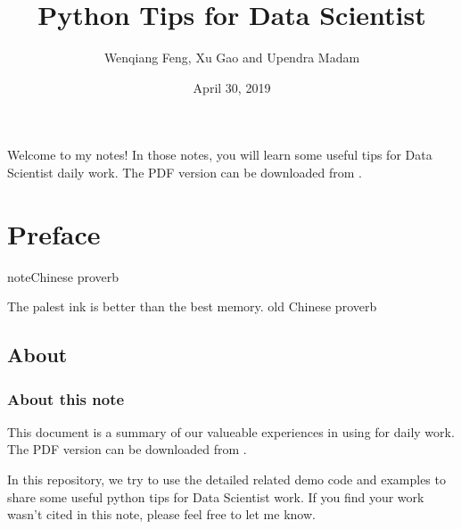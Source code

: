 \documentclass[letterpaper,12pt,english]{sphinxmanual}
\title{Python Tips for Data Scientist}
\date{April 30, 2019}
\author{Wenqiang Feng, Xu Gao and Upendra Madam}
\begin{document}
\pagestyle{empty}
\sphinxmaketitle
\pagestyle{plain}
\sphinxtableofcontents
\pagestyle{normal}
\label{\detokenize{index::doc}}\begin{quote}

\begin{figure}[htbp]
\centering

\noindent{}
\end{figure}
\end{quote}

Welcome to my  notes! In those notes, you will learn some useful tips for Data Scientist daily work. The PDF version can be downloaded from .




\chapter{Preface}
\label{\detokenize{preface:preface}}\label{\detokenize{preface:id1}}\label{\detokenize{preface::doc}}
\begin{sphinxadmonition}{note}{Chinese proverb}

The palest ink is better than the best memory. \textendash{} old Chinese proverb
\end{sphinxadmonition}


\section{About}
\label{\detokenize{preface:about}}

\subsection{About this note}
\label{\detokenize{preface:about-this-note}}
This document is a summary of our valueable experiences in using 
for  daily work. The PDF version can be downloaded from .


In this repository, we try to use the detailed  related demo code and
examples to share some useful python tips for Data Scientist work. If you
find your work wasn’t cited in this note, please feel free to let me know.
\end{document}
